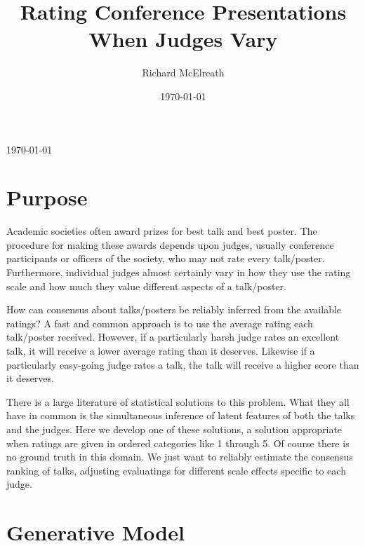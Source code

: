 \documentclass[reqno ,11pt]{amsart}
\begin{document}
\title[Rating When Judges Vary]{\large Rating Conference Presentations\\When Judges Vary}
\author{Richard McElreath}
\address{Department of Human Behavior, Ecology and Culture, Max Planck Institute for Evolutionary Anthropology, Deutscher Platz 6, 04103 Leipzig, Germany}
\date{\today}

\maketitle

{\vspace{-6pt}\footnotesize\begin{center}\today\end{center}\vspace{24pt}}

\linenumbers
\modulolinenumbers[5]

\section{Purpose}

Academic societies often award prizes for best talk and best poster. The procedure for making these awards depends upon judges, usually conference participants or officers of the society, who may not rate every talk/poster. Furthermore, individual judges almost certainly vary in how they use the rating scale and how much they value different aspects of a talk/poster. 

How can consensus about talks/posters be reliably inferred from the available ratings? A fast and common approach is to use the average rating each talk/poster received. However, if a particularly harsh judge rates an excellent talk, it will receive a lower average rating than it deserves. Likewise if a particularly easy-going judge rates a talk, the talk will receive a higher score than it deserves.

There is a large literature of statistical solutions to this problem. What they all have in common is the simultaneous inference of latent features of both the talks and the judges. Here we develop one of these solutions, a solution appropriate when ratings are given in ordered categories like 1 through 5. Of course there is no ground truth in this domain. We just want to reliably estimate the consensus ranking of talks, adjusting evaluatings for different scale effects specific to each judge.

\section{Generative Model}
\end{document}
